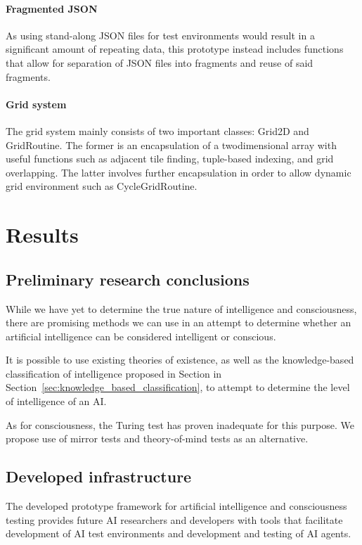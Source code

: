 \documentclass[masterthesis]{fer}
\begin{document}
\subsubsection{Fragmented JSON}
As using stand-along JSON files for test environments would result in a significant amount of repeating data,
this prototype instead includes functions that allow for separation of JSON files into fragments and reuse of said fragments.

\subsubsection{Grid system}
The grid system mainly consists of two important classes: Grid2D and GridRoutine.
The former is an encapsulation of a twodimensional array with useful functions such as adjacent tile finding, tuple-based indexing, and grid overlapping.
The latter involves further encapsulation in order to allow dynamic grid environment such as CycleGridRoutine.
\chapter{Results}
\label{sec:results}
\section{Preliminary research conclusions}
While we have yet to determine the true nature of intelligence and consciousness, there are promising methods we can use in an attempt to determine whether an artificial intelligence can be considered intelligent or conscious.

It is possible to use existing theories of existence, as well as the knowledge-based classification of intelligence proposed in Section in Section~\ref{sec:knowledge_based_classification}, to attempt to determine the level of intelligence of an AI. 

As for consciousness, the Turing test has proven inadequate for this purpose. We propose use of mirror tests and theory-of-mind tests as an alternative.
\section{Developed infrastructure}
The developed prototype framework for artificial intelligence and consciousness testing provides future AI researchers and developers with tools that facilitate development of AI test environments and development and testing of AI agents. 
\end{document}
